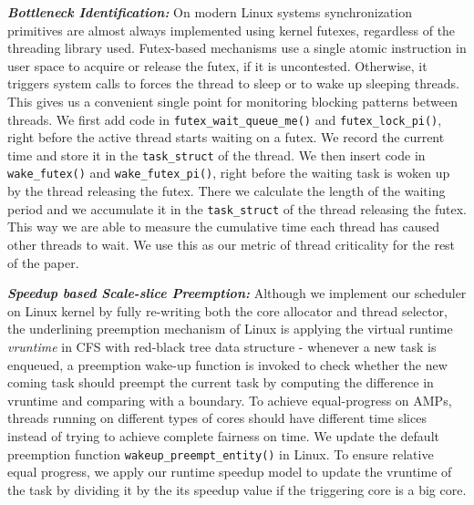 \textbf{\textit{Bottleneck Identification:}}
On modern Linux systems synchronization primitives are almost always implemented using kernel futexes, regardless of the threading library used. Futex-based mechanisms use a single atomic instruction in user space to acquire or release the futex, if it is uncontested. Otherwise, it triggers system calls to forces the thread to sleep or to wake up sleeping threads.
This gives us a convenient single point for monitoring blocking patterns between threads. We first add code in \texttt{futex\_wait\_queue\_me()} and \texttt{futex\_lock\_pi()}, right before the active thread starts waiting on a futex. We record the current time and store it in the \texttt{task\_struct} of the thread. We then insert code in \texttt{wake\_futex()} and \texttt{wake\_futex\_pi()}, right before the waiting task is woken up by the thread releasing the futex. There we calculate the length of the waiting period and we accumulate it in the \texttt{task\_struct} of the thread releasing the futex. This way we are able to measure the cumulative time each thread has caused other threads to wait. We use this as our metric of thread criticality for the rest of the paper.

\textbf{\textit {Speedup based Scale-slice Preemption:}} Although we implement our scheduler on Linux kernel by fully re-writing both the core allocator and thread selector, the underlining preemption mechanism of Linux is applying the virtual runtime {\it vruntime} in CFS with red-black tree data structure - whenever a new task is enqueued, a preemption wake-up function is invoked to check whether the new coming task should preempt the current task by computing the difference in vruntime and comparing with a boundary. 
To achieve equal-progress on AMPs, threads running on different types of cores should have different time slices instead of trying to achieve complete fairness on time. We update the default preemption function \texttt{wakeup\_preempt\_entity()} in Linux. To ensure relative equal progress, we apply our runtime speedup model to update the vruntime of the task by dividing it by the its speedup value if the triggering core is a big core. %




